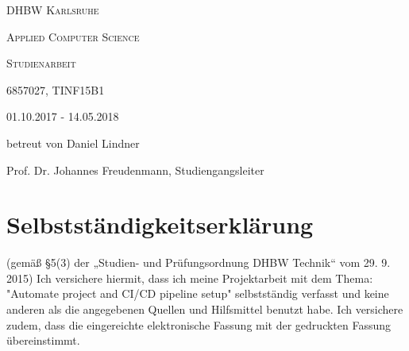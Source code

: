 \makeatletter
\begin{titlepage}
\centering
	{\scshape\LARGE DHBW Karlsruhe \par}
	{\scshape Applied Computer Science \par}
	\vspace{1cm}
	{\scshape\Large Studienarbeit\par}
	\vspace{1.5cm}
	{\huge\textbf{\@title} \par}
	\vspace{2cm}
	{\Large \@author \par}
	{\Large 6857027, TINF15B1 \par}
	\vspace{6cm}
	
	{\scshape
	01.10.2017 - 14.05.2018\par
	betreut von Daniel Lindner \par 
	Prof. Dr. Johannes Freudenmann, Studiengangsleiter}

\end{titlepage}

\section*{Selbstständigkeitserklärung}
(gemäß §5(3) der „Studien- und Prüfungsordnung DHBW Technik“ vom 29. 9. 2015)
Ich versichere hiermit, dass ich meine Projektarbeit mit dem Thema: "Automate project and CI/CD pipeline setup" selbstständig verfasst und keine anderen als die angegebenen Quellen und Hilfsmittel benutzt habe. Ich versichere zudem, dass die eingereichte elektronische Fassung mit der gedruckten Fassung übereinstimmt.

\vspace{2 cm}
